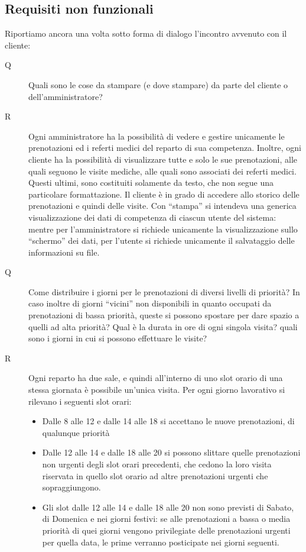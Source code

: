 \subsection{Requisiti non funzionali}
Riportiamo ancora una volta sotto forma di dialogo l'incontro avvenuto con il
cliente:

\begin{description}
\item[Q] Quali sono le cose da stampare (e dove stampare) da parte del cliente o dell'amministratore?
\item[R] Ogni amministratore ha la possibilità di vedere e gestire unicamente le prenotazioni ed i referti medici del reparto di sua competenza. Inoltre, ogni cliente ha la possibilità di visualizzare tutte e solo le sue prenotazioni, alle quali seguono le visite mediche, alle quali sono associati dei referti medici. Questi ultimi, sono costituiti solamente da testo, che non segue una particolare formattazione. Il cliente è in grado di accedere allo storico delle prenotazioni e quindi delle visite.
Con ``stampa'' si intendeva una generica visualizzazione dei dati di competenza di ciascun utente del sistema: mentre per l'amministratore si richiede unicamente la visualizzazione sullo ``schermo'' dei dati, per l'utente si richiede unicamente il salvataggio delle informazioni su file.
\medskip

\item[Q] Come distribuire i giorni per le prenotazioni di diversi livelli di priorità?
   In caso inoltre di giorni ``vicini'' non disponibili in quanto occupati da prenotazioni di bassa
   priorità, queste si possono spostare per dare spazio a quelli ad alta priorità?
   Qual è la durata in ore di ogni singola visita? quali sono i giorni in cui si possono effettuare le visite?
\item[R] Ogni reparto ha due sale, e quindi all'interno di uno slot orario di una stessa giornata è possibile un'unica visita. Per ogni giorno lavorativo si rilevano i seguenti slot orari:
\begin{itemize}
 \item Dalle 8 alle 12 e dalle 14 alle 18 si accettano le nuove prenotazioni, di qualunque priorità
 \item  Dalle 12 alle 14 e dalle 18 alle 20 si possono slittare quelle prenotazioni non urgenti degli slot orari precedenti, che cedono la loro visita riservata in quello slot orario ad altre prenotazioni urgenti che sopraggiungono.
 \item  Gli slot dalle 12 alle 14 e dalle 18 alle 20 non sono previsti di Sabato, di Domenica e nei giorni festivi: se alle prenotazioni a bassa o media priorità di quei giorni vengono privilegiate delle prenotazioni urgenti per quella data, le prime verranno posticipate nei giorni seguenti.
 \end{itemize}
 \medskip



\end{description}
